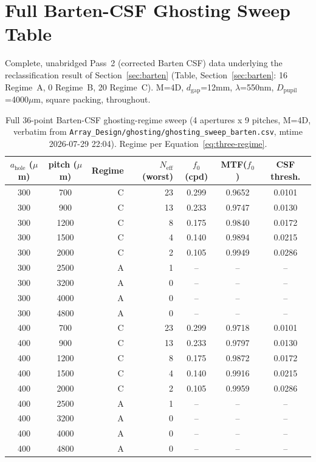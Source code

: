 \chapter{Full Barten-CSF Ghosting Sweep Table}
\label{ch:full-barten-table}
Complete, unabridged Pass~2 (corrected Barten CSF) data underlying the reclassification result of Section~\ref{sec:barten} (Table, Section~\ref{sec:barten}: 16 Regime~A, 0 Regime~B, 20 Regime~C). M=4D, $d_{\mathrm{gap}}$=12mm, $\lambda$=550nm, $D_{\mathrm{pupil}}$=4000$\mu$m, square packing, throughout.

\begin{longtable}{ccrrccc}
\caption{Full 36-point Barten-CSF ghosting-regime sweep (4 apertures x 9 pitches, M=4D, verbatim from \texttt{Array\_Design/ghosting/ghosting\_sweep\_barten.csv}, mtime 2026-07-29 22:04). Regime per Equation~\ref{eq:three-regime}.}\label{tab:full-barten-sweep}\\
\toprule
$a_{\mathrm{hole}}$ ($\mu$m) & pitch ($\mu$m) & Regime & $N_{\mathrm{eff}}$ (worst) & $f_0$ (cpd) & MTF($f_0$) & CSF thresh. \\
\midrule
\endhead
300 & 700 & C & 23 & 0.299 & 0.9652 & 0.0101 \\
300 & 900 & C & 13 & 0.233 & 0.9747 & 0.0130 \\
300 & 1200 & C & 8 & 0.175 & 0.9840 & 0.0172 \\
300 & 1500 & C & 4 & 0.140 & 0.9894 & 0.0215 \\
300 & 2000 & C & 2 & 0.105 & 0.9949 & 0.0286 \\
300 & 2500 & A & 1 & -- & -- & -- \\
300 & 3200 & A & 0 & -- & -- & -- \\
300 & 4000 & A & 0 & -- & -- & -- \\
300 & 4800 & A & 0 & -- & -- & -- \\
400 & 700 & C & 23 & 0.299 & 0.9718 & 0.0101 \\
400 & 900 & C & 13 & 0.233 & 0.9797 & 0.0130 \\
400 & 1200 & C & 8 & 0.175 & 0.9872 & 0.0172 \\
400 & 1500 & C & 4 & 0.140 & 0.9916 & 0.0215 \\
400 & 2000 & C & 2 & 0.105 & 0.9959 & 0.0286 \\
400 & 2500 & A & 1 & -- & -- & -- \\
400 & 3200 & A & 0 & -- & -- & -- \\
400 & 4000 & A & 0 & -- & -- & -- \\
400 & 4800 & A & 0 & -- & -- & -- \\

\end{longtable}
